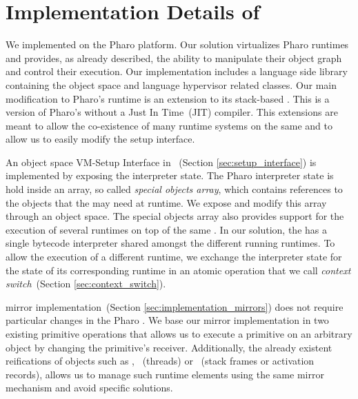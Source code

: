 
\chapter{Implementation Details of \Vtt}
\minitoc
\introduction

We implemented \Vtt on the Pharo platform. Our solution virtualizes Pharo runtimes and provides, as already described, the ability to manipulate their object graph and control their execution. Our implementation includes a language side library containing the object space and language hypervisor related classes. Our main modification to Pharo's runtime is an extension to its stack-based \VM. This \VM is a version of Pharo's \VM without a Just In Time~(JIT) compiler. This extensions are meant to allow the co-existence of many runtime systems on the same \VM and to allow us to easily modify the \VM setup interface.

An object space VM-Setup Interface in \Vtt~(Section \ref{sec:setup_interface}) is implemented by exposing the \VM interpreter state. The Pharo \VM interpreter state is hold inside an array, so called \emph{special objects array}, which contains references to the objects that the \VM may need at runtime. We expose and modify this array through an object space. The special objects array also provides support for the execution of several runtimes on top of the same \VM. In our solution, the \VM has a single bytecode interpreter shared amongst the different running runtimes. To allow the execution of a different runtime, we exchange the interpreter state for the state of its corresponding runtime in an atomic operation that we call \emph{context switch}~(Section \ref{sec:context_switch}).

\Vtt mirror implementation~(Section \ref{sec:implementation_mirrors}) does not require particular changes in the Pharo \VM. We base our mirror implementation in two existing \VM primitive operations that allows us to execute a primitive on an arbitrary object by changing the primitive's receiver. Additionally, the already existent reifications of objects such as , ~(threads) or ~(stack frames or activation records), allows us to manage such runtime elements using the same mirror mechanism and avoid specific solutions.

